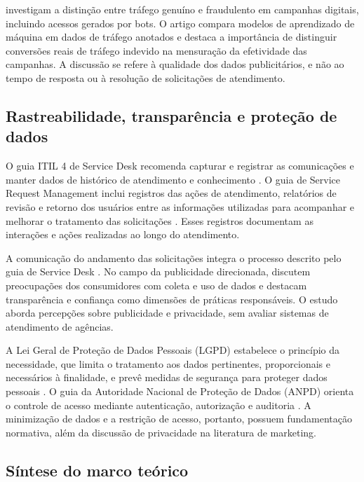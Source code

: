  investigam a distinção entre tráfego genuíno e fraudulento em campanhas digitais, incluindo acessos gerados por bots. O artigo compara modelos de aprendizado de máquina em dados de tráfego anotados e destaca a importância de distinguir conversões reais de tráfego indevido na mensuração da efetividade das campanhas. A discussão se refere à qualidade dos dados publicitários, e não ao tempo de resposta ou à resolução de solicitações de atendimento.

\subsection{\esp Rastreabilidade, transparência e proteção de dados}

O guia ITIL 4 de Service Desk recomenda capturar e registrar as comunicações e manter dados de histórico de atendimento e conhecimento \cite{servicedesk2023}. O guia de Service Request Management inclui registros das ações de atendimento, relatórios de revisão e retorno dos usuários entre as informações utilizadas para acompanhar e melhorar o tratamento das solicitações \cite{servicerequest2020}. Esses registros documentam as interações e ações realizadas ao longo do atendimento.

A comunicação do andamento das solicitações integra o processo descrito pelo guia de Service Desk \cite{servicedesk2023}. No campo da publicidade direcionada,  discutem preocupações dos consumidores com coleta e uso de dados e destacam transparência e confiança como dimensões de práticas responsáveis. O estudo aborda percepções sobre publicidade e privacidade, sem avaliar sistemas de atendimento de agências.

A Lei Geral de Proteção de Dados Pessoais (LGPD) estabelece o princípio da necessidade, que limita o tratamento aos dados pertinentes, proporcionais e necessários à finalidade, e prevê medidas de segurança para proteger dados pessoais \cite{brasil2018}. O guia da Autoridade Nacional de Proteção de Dados (ANPD) orienta o controle de acesso mediante autenticação, autorização e auditoria \cite{anpd2021}. A minimização de dados e a restrição de acesso, portanto, possuem fundamentação normativa, além da discussão de privacidade na literatura de marketing.

\subsection{\esp Síntese do marco teórico}

